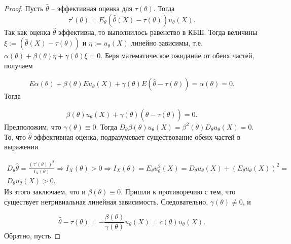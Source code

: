 \begin{proof}
Пусть $\displaystyle \hat{\theta }$ -- эффективная оценка для $\displaystyle \tau ( \theta )$. Тогда
\begin{equation*}
\tau '( \theta ) =E_{\theta }(\hat{\theta }( X) -\tau ( \theta )) u_{\theta }( X) .
\end{equation*}
Так как оценка $\displaystyle \hat{\theta }$ эффективна, то выполнилось равенство в КБШ. Тогда величины $\displaystyle \xi :=(\hat{\theta }( X) -\tau ( \theta ))$ и $\displaystyle \eta :=u_{\theta }( X)$ линейно зависимы, т.е. $\displaystyle \alpha ( \theta ) +\beta ( \theta ) \eta +\gamma ( \theta ) \xi =0$. Беря математическое ожидание от обеих частей, получаем


\begin{equation*}
E\alpha ( \theta ) + \beta ( \theta ) Eu_{\theta }( X) + \gamma ( \theta ) E(\hat{\theta } -\tau ( \theta )) =\alpha ( \theta ) =0.
\end{equation*}
Тогда


\begin{equation*}
\beta ( \theta ) u_{\theta }( X) +\gamma ( \theta )(\hat{\theta } -\tau ( \theta )) =0.
\end{equation*}
Предположим, что $\displaystyle \gamma ( \theta ) \equiv 0$. Тогда $\displaystyle D_{\theta } \beta ( \theta ) u_{\theta }( X) =\beta ^{2}( \theta ) D_{\theta } u_{\theta }( X) =0$. То, что $\displaystyle \hat{\theta }$ эффективная оценка, подразумевает существование обеих частей в выражении


\begin{gather*}
D_{\theta }\hat{\theta } =\frac{( \tau '( \theta ))^{2}}{I_{X}( \theta )} \Rightarrow I_{X}( \theta )  >0\Rightarrow I_{X}( \theta ) =E_{\theta } u_{\theta }^{2}( X) =D_{\theta } u_{\theta }( X) +( E_{\theta } u_{\theta }( X))^{2} =\\
D_{\theta } u_{\theta }( X)  >0.
\end{gather*}
Из этого заключаем, что и $\displaystyle \beta ( \theta ) \equiv 0$. Пришли к противоречию с тем, что существует нетривиальная линейная зависимость. Следовательно, $\displaystyle \gamma ( \theta ) \neq 0$, и


\begin{equation*}
\hat{\theta } -\tau ( \theta ) =-\frac{\beta ( \theta )}{\gamma ( \theta )} u_{\theta }( X) =c( \theta ) u_{\theta }( X) .
\end{equation*}
Обратно, пусть



\end{proof}
